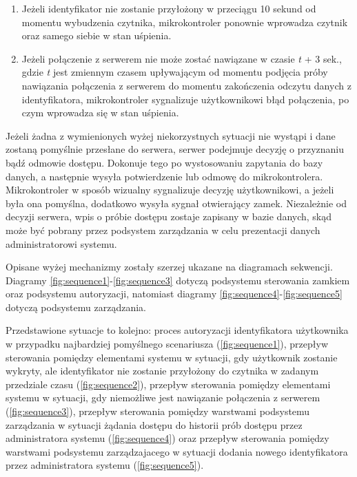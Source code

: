             \begin{enumerate}
                \item
                    Jeżeli identyfikator nie zostanie przyłożony w przeciągu 10 sekund od momentu wybudzenia czytnika, mikrokontroler ponownie wprowadza czytnik oraz samego siebie w stan uśpienia.
                \item
                    Jeżeli połączenie z serwerem nie może zostać nawiązane w czasie \textit{t} + 3 sek., gdzie \textit{t} jest zmiennym czasem upływającym od momentu podjęcia próby nawiązania połączenia z serwerem do momentu zakończenia odczytu danych z identyfikatora, mikrokontroler sygnalizuje użytkownikowi błąd połączenia, po czym wprowadza się w stan uśpienia.
            \end{enumerate}

            Jeżeli żadna z wymienionych wyżej niekorzystnych sytuacji nie wystąpi i dane zostaną pomyślnie przesłane do serwera, serwer podejmuje decyzję o przyznaniu bądź odmowie dostępu. Dokonuje tego po wystosowaniu zapytania do bazy danych, a następnie wysyła potwierdzenie lub odmowę do mikrokontrolera. Mikrokontroler w sposób wizualny sygnalizuje decyzję użytkownikowi, a jeżeli była ona pomyślna, dodatkowo wysyła sygnał otwierający zamek. Niezależnie od decyzji serwera, wpis o próbie dostępu zostaje zapisany w bazie danych, skąd może być pobrany przez podsystem zarządzania w celu prezentacji danych administratorowi systemu.

            Opisane wyżej mechanizmy zostały szerzej ukazane na diagramach sekwencji. Diagramy \ref{fig:sequence1}-\ref{fig:sequence3} dotyczą podsystemu sterowania zamkiem oraz podsystemu autoryzacji, natomiast diagramy \ref{fig:sequence4}-\ref{fig:sequence5} dotyczą podsystemu zarządzania.

            Przedstawione sytuacje to kolejno: proces autoryzacji identyfikatora użytkownika w przypadku najbardziej pomyślnego scenariusza (\ref{fig:sequence1}), przepływ sterowania pomiędzy elementami systemu w sytuacji, gdy użytkownik zostanie wykryty, ale identyfikator nie zostanie przyłożony do czytnika w zadanym przedziale czasu (\ref{fig:sequence2}), przepływ sterowania pomiędzy elementami systemu w sytuacji, gdy niemożliwe jest nawiązanie połączenia z serwerem (\ref{fig:sequence3}), przepływ sterowania pomiędzy warstwami podsystemu zarządzania w sytuacji żądania dostępu do historii prób dostępu przez administratora systemu (\ref{fig:sequence4}) oraz przepływ sterowania pomiędzy warstwami podsystemu zarządzajacego w sytuacji dodania nowego identyfikatora przez administratora systemu (\ref{fig:sequence5}).

